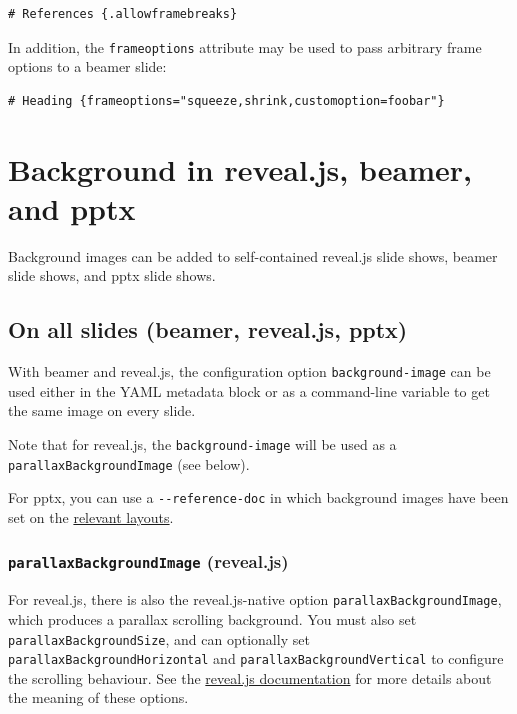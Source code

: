 \documentclass[
  b5paper
]{book}
\begin{document}
\begin{verbatim}
# References {.allowframebreaks}
\end{verbatim}

In addition, the \texttt{frameoptions} attribute may be used to pass
arbitrary frame options to a beamer slide:

\begin{verbatim}
# Heading {frameoptions="squeeze,shrink,customoption=foobar"}
\end{verbatim}

\section{Background in reveal.js, beamer, and
pptx}\label{background-in-reveal.js-beamer-and-pptx}

Background images can be added to self-contained reveal.js slide shows,
beamer slide shows, and pptx slide shows.

\subsection{On all slides (beamer, reveal.js,
pptx)}\label{on-all-slides-beamer-reveal.js-pptx}

With beamer and reveal.js, the configuration option
\texttt{background-image} can be used either in the YAML metadata block
or as a command-line variable to get the same image on every slide.

Note that for reveal.js, the \texttt{background-image} will be used as a
\texttt{parallaxBackgroundImage} (see below).

For pptx, you can use a \texttt{-\/-reference-doc} in which background
images have been set on the \hyperref[powerpoint-layout-choice]{relevant
layouts}.

\subsubsection{\texorpdfstring{\texttt{parallaxBackgroundImage}
(reveal.js)}{parallaxBackgroundImage (reveal.js)}}\label{parallaxbackgroundimage-reveal.js}

For reveal.js, there is also the reveal.js-native option
\texttt{parallaxBackgroundImage}, which produces a parallax scrolling
background. You must also set \texttt{parallaxBackgroundSize}, and can
optionally set \texttt{parallaxBackgroundHorizontal} and
\texttt{parallaxBackgroundVertical} to configure the scrolling
behaviour. See the
\href{https://revealjs.com/backgrounds/\#parallax-background}{reveal.js
documentation} for more details about the meaning of these options.
\end{document}

